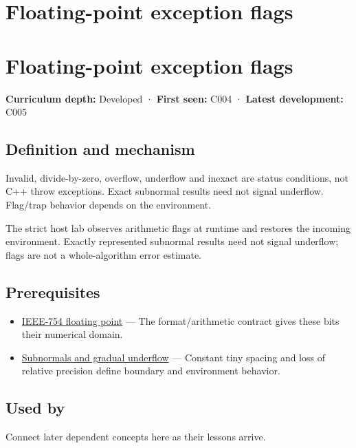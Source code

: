 \hypertarget{appendix-ed8531b46754}{}
\section*{Floating-point exception flags}
\section{Floating-point exception flags}\label{appendix-ed8531b46754-floating-point-exception-flags}

\textbf{Curriculum depth:} Developed · \textbf{First seen:} C004 · \textbf{Latest development:} C005

\subsection{Definition and mechanism}\label{appendix-ed8531b46754-definition-and-mechanism}

Invalid, divide-by-zero, overflow, underflow and inexact are status conditions, not C++ throw exceptions. Exact subnormal results need not signal underflow. Flag/trap behavior depends on the environment.

The strict host lab observes arithmetic flags at runtime and restores the incoming environment. Exactly represented subnormal results need not signal underflow; flags are not a whole-algorithm error estimate.

\subsection{Prerequisites}\label{appendix-ed8531b46754-prerequisites}

\begin{itemize}
\tightlist
\item
  \hyperref[appendix-343615f49ddf]{IEEE-754 floating point} --- The format/arithmetic contract gives these bits their numerical domain.
\item
  \hyperref[appendix-00a6e044c437]{Subnormals and gradual underflow} --- Constant tiny spacing and loss of relative precision define boundary and environment behavior.
\end{itemize}

\subsection{Used by}\label{appendix-ed8531b46754-used-by}

Connect later dependent concepts here as their lessons arrive.

